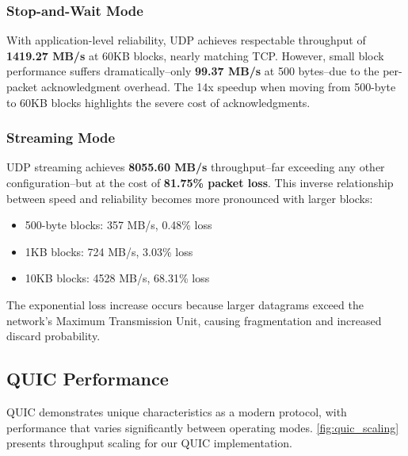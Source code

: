 \documentclass[12pt,a4paper]{article}
\begin{document}
\subsubsection{Stop-and-Wait Mode}
With application-level reliability, UDP achieves respectable throughput of \textbf{1419.27 MB/s} at 60KB blocks, nearly matching TCP. However, small block performance suffers dramatically--only \textbf{99.37 MB/s} at 500 bytes--due to the per-packet acknowledgment overhead. The 14x speedup when moving from 500-byte to 60KB blocks highlights the severe cost of acknowledgments.

\subsubsection{Streaming Mode}
UDP streaming achieves \textbf{8055.60 MB/s} throughput--far exceeding any other configuration--but at the cost of \textbf{81.75\% packet loss}. This inverse relationship between speed and reliability becomes more pronounced with larger blocks:
\begin{itemize}
    \item 500-byte blocks: 357 MB/s, 0.48\% loss
    \item 1KB blocks: 724 MB/s, 3.03\% loss  
    \item 10KB blocks: 4528 MB/s, 68.31\% loss
\end{itemize}
The exponential loss increase occurs because larger datagrams exceed the network's Maximum Transmission Unit, causing fragmentation and increased discard probability.

\subsection{QUIC Performance}


QUIC demonstrates unique characteristics as a modern protocol, with performance that varies significantly between operating modes. \autoref{fig:quic_scaling} presents throughput scaling for our QUIC implementation.
\end{document}
